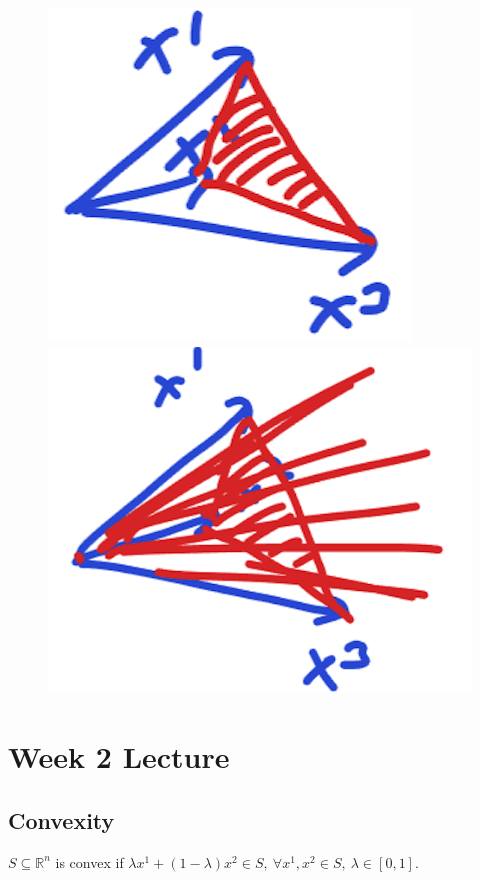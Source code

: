 \documentclass[11pt]{article}
\numberwithin{equation}{section}
\begin{document}
\begin{figure}[H]
    \centering
    \begin{minipage}{.5\textwidth}
      \centering
      \includegraphics[width=.3\linewidth]{images/1-ex-2.png}
    \end{minipage}%
    \begin{minipage}{.5\textwidth}
      \centering
      \includegraphics[width=.3\linewidth]{images/1-ex-3.png}
    \end{minipage}
\end{figure}

\newpage
\section{Week 2 Lecture}
\subsection{Convexity}
\begin{definition}
    $S \subseteq \mathbb{R}^n$ is convex if $\lambda x^1 + (1-\lambda)x^2 \in S, \ \forall x^1,x^2\in S, \ \lambda\in [0,1]$.
\end{definition}
\end{document}
